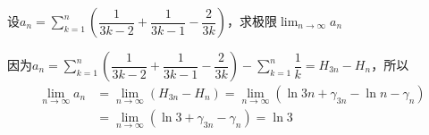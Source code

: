\begin{example}
    设$a_n=\displaystyle\sum_{k=1}^n\left(\dfrac{1}{3k-2}+\dfrac{1}{3k-1}-\dfrac{2}{3k}\right)$，求极限$\displaystyle\lim_{n\rightarrow\infty}a_n$
\end{example}

\begin{solution}
    因为$a_n=\displaystyle\sum_{k=1}^n\left(\dfrac{1}{3k-2}+\dfrac{1}{3k-1}-\dfrac{2}{3k}\right)-\sum_{k=1}^n\dfrac{1}{k}=H_{3n}-H_n$，所以
    \begin{equation}
    \begin{aligned}
        \lim_{n\rightarrow\infty}a_n &= \lim_{n\rightarrow\infty}(H_{3n}-H_n)=\lim_{n\rightarrow\infty}(\ln 3n+\gamma_{3n}-\ln n-\gamma_n) \\
        &= \lim_{n\rightarrow\infty}(\ln 3+\gamma_{3n}-\gamma_n)=\ln 3
    \end{aligned}
    \nonumber
    \end{equation}
\end{solution}


